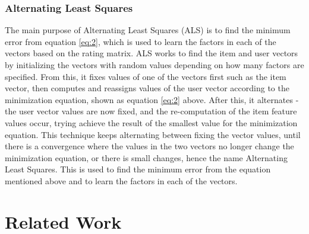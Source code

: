 

\subsubsection{Alternating Least Squares}

The main purpose of Alternating Least Squares (ALS) is to find the minimum error from equation \ref{eq:2}, which is used to learn the factors in each of the vectors based on the rating matrix. ALS works to find the item and user vectors by initializing the vectors with random values depending on how many factors are specified. From this, it fixes values of one of the vectors first such as the item vector, then computes and reassigns values of the user vector according to the minimization equation, shown as equation \ref{eq:2} above. After this, it alternates - the user vector values are now fixed, and the re-computation of the item feature values occur, trying achieve the result of the smallest value for the minimization equation. This technique keeps alternating between fixing the vector values, until there is a convergence where the values in the two vectors no longer change the minimization equation, or there is small changes, hence the name Alternating Least Squares. This is used to find the minimum error from the equation mentioned above and to learn the factors in each of the vectors. 

\section{Related Work}

